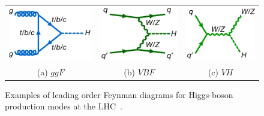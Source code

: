 \begin{figure}[htbp]
    \centering
    \begin{tabular}{ccc}
        \includegraphics[width=0.3\linewidth]{images/ggF.png}  &
        \includegraphics[width=0.3\linewidth]{images/VBF.png}  &
        \includegraphics[width=0.3\linewidth]{images/VH.png}   \\
        (a) $ggF$ & (b) $VBF$ & (c) $VH$ \\
    \end{tabular}
    \vspace{0.5em} %
    \caption{
    Examples of leading order Feynman diagrams for Higgs-boson production modes at the LHC~\cite{Nature_ATLAS}.}
    \label{fig:higgs_production}
\end{figure}

